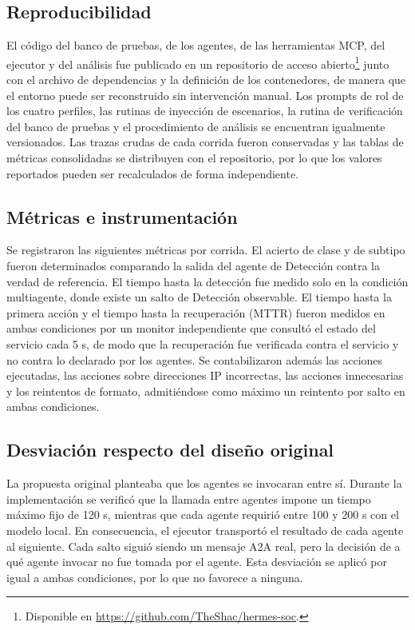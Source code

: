 \documentclass[conference]{IEEEtran}
\begin{document}
\subsection{Reproducibilidad}
El código del banco de pruebas, de los agentes, de las herramientas MCP, del ejecutor
y del análisis fue publicado en un repositorio de acceso abierto\footnote{Disponible
en \url{https://github.com/TheShac/hermes-soc}.} junto con el archivo de
dependencias y la definición de los contenedores, de manera que el entorno puede ser
reconstruido sin intervención manual. Los prompts de rol de los cuatro perfiles, las
rutinas de inyección de escenarios, la rutina de verificación del banco de pruebas y
el procedimiento de análisis se encuentran igualmente versionados. Las trazas crudas
de cada corrida fueron conservadas y las tablas de métricas consolidadas se
distribuyen con el repositorio, por lo que los valores reportados pueden ser
recalculados de forma independiente.

\subsection{Métricas e instrumentación}
Se registraron las siguientes métricas por corrida. El acierto de clase y de
subtipo fueron determinados comparando la salida del agente de Detección contra la
verdad de referencia. El tiempo hasta la detección fue medido solo en la condición
multiagente, donde existe un salto de Detección observable. El tiempo hasta la
primera acción y el tiempo hasta la recuperación (MTTR) fueron medidos en ambas
condiciones por un monitor independiente que consultó el estado del servicio cada
5 s, de modo que la recuperación fue verificada contra el servicio y no contra lo
declarado por los agentes. Se contabilizaron además las acciones ejecutadas, las
acciones sobre direcciones IP incorrectas, las acciones innecesarias y los
reintentos de formato, admitiéndose como máximo un reintento por salto en ambas
condiciones.

\subsection{Desviación respecto del diseño original}
La propuesta original planteaba que los agentes se invocaran entre sí. Durante la
implementación se verificó que la llamada entre agentes impone un tiempo máximo fijo
de 120 s, mientras que cada agente requirió entre 100 y 200 s con el modelo local.
En consecuencia, el ejecutor transportó el resultado de cada agente al siguiente.
Cada salto siguió siendo un mensaje A2A real, pero la decisión de a qué agente
invocar no fue tomada por el agente. Esta desviación se aplicó por igual a ambas
condiciones, por lo que no favorece a ninguna.
\end{document}
